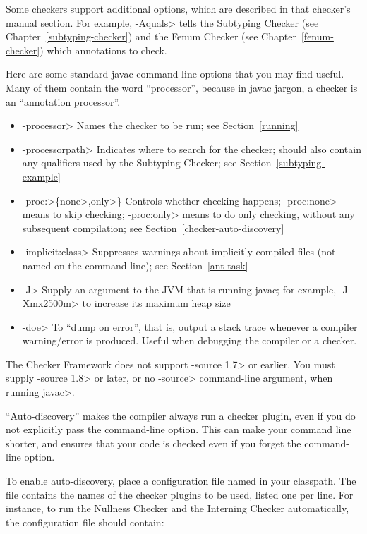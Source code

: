 \noindent
Some checkers support additional options, which are described in that
checker's manual section.
For example, \<-Aquals> tells
the Subtyping Checker (see Chapter~\ref{subtyping-checker}) and the Fenum Checker
(see Chapter~\ref{fenum-checker}) which annotations to check.


Here are some standard javac command-line options that you may find useful.
Many of them contain the word ``processor'', because in javac jargon, a
checker is an ``annotation processor''.

\begin{itemize}
\item \<-processor> Names the checker to be
  run; see Section~\ref{running}
\item \<-processorpath> Indicates where to search for the
  checker; should also contain any qualifiers used by the Subtyping
  Checker; see Section~\ref{subtyping-example}
\item \<-proc:>\{\<none>,\<only>\} Controls whether checking
  happens; \<-proc:none>
  means to skip checking; \<-proc:only> means to do only
  checking, without any subsequent compilation; see
  Section~\ref{checker-auto-discovery}
\item \<-implicit:class> Suppresses warnings about implicitly compiled files
  (not named on the command line); see Section~\ref{ant-task}
\item \<-J> Supply an argument to the JVM that is running javac;
  for example, \<-J-Xmx2500m> to increase its maximum heap size
\item \<-doe> To ``dump on error'', that is, output a stack trace
  whenever a compiler warning/error is produced. Useful when debugging
  the compiler or a checker.
\end{itemize}

The Checker Framework does not support \<-source 1.7> or earlier.  You must
supply \<-source 1.8> or later, or no \<-source> command-line argument,
when running \<javac>.



``Auto-discovery'' makes the  compiler always run a checker
plugin, even if you do not explicitly pass the 
command-line option.  This can make your command line shorter, and ensures
that your code is checked even if you forget the command-line option.

\begin{sloppypar}
To enable auto-discovery, place a configuration file named
in your classpath.  The file contains the names of the checker plugins to
be used, listed one per line.  For instance, to run the Nullness Checker and the
Interning Checker automatically, the configuration file should contain:
\end{sloppypar}

